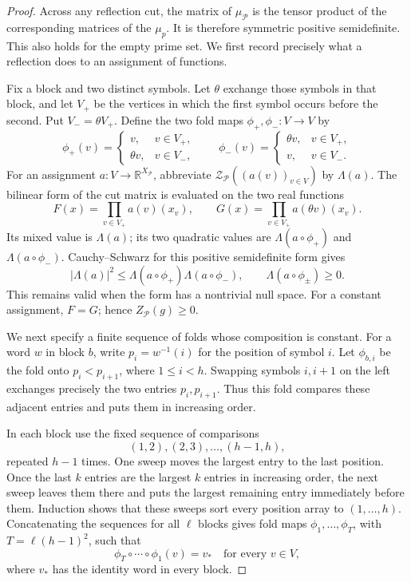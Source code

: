 \begin{proof}
Across any reflection cut, the matrix of \(\mu_{\mathcal P}\) is
the tensor product of the corresponding matrices of the \(\mu_p\).
It is therefore symmetric positive semidefinite.  This also holds for
the empty prime set.  We first record precisely what a reflection does
to an assignment of functions.

Fix a block and two distinct symbols.  Let \(\theta\) exchange those
symbols in that block, and let \(V_+\) be the vertices in which the
first symbol occurs before the second.  Put \(V_-=\theta V_+\).
Define the two fold maps \(\phi_+,\phi_-:V\to V\) by
\[
 \phi_+(v)=
 \begin{cases}v,&v\in V_+,\\\theta v,&v\in V_-,\end{cases}
 \qquad
 \phi_-(v)=
 \begin{cases}\theta v,&v\in V_+,\\v,&v\in V_-.\end{cases}
\]
For an assignment \(a:V\to\mathbb R^{X_{\mathcal P}}\), abbreviate
\(\mathcal Z_{\mathcal P}((a(v))_{v\in V})\) by \(\Lambda(a)\).
The bilinear form of the cut matrix is evaluated on the two real
functions
\[
 F(x)=\prod_{v\in V_+}a(v)(x_v),
 \qquad
 G(x)=\prod_{v\in V_+}a(\theta v)(x_v).
\]
Its mixed value is \(\Lambda(a)\); its two quadratic values are
\(\Lambda(a\circ\phi_+)\) and \(\Lambda(a\circ\phi_-)\).
Cauchy--Schwarz for this positive semidefinite form gives
\begin{equation}
 |\Lambda(a)|^2
 \le\Lambda(a\circ\phi_+)\Lambda(a\circ\phi_-),
 \qquad
 \Lambda(a\circ\phi_\pm)\ge0.
 \label{eq:folding-cauchy-schwarz}
\end{equation}
This remains valid when the form has a nontrivial null space.
For a constant assignment, \(F=G\); hence \(Z_{\mathcal P}(g)\ge0\).

We next specify a finite sequence of folds whose composition is constant.
For a word \(w\) in block \(b\), write \(p_i=w^{-1}(i)\) for the
position of symbol \(i\).  Let \(\phi_{b,i}\) be the fold onto
\(p_i<p_{i+1}\), where \(1\le i<h\).  Swapping symbols \(i,i+1\)
on the left exchanges precisely the two entries \(p_i,p_{i+1}\).
Thus this fold compares these adjacent entries and puts them in
increasing order.

In each block use the fixed sequence of comparisons
\[
 (1,2),(2,3),\ldots,(h-1,h),
\]
repeated \(h-1\) times.  One sweep moves the largest entry to the
last position.  Once the last \(k\) entries are the largest \(k\)
entries in increasing order, the next sweep leaves them there and puts
the largest remaining entry immediately before them.  Induction shows
that these sweeps sort every position array to \((1,\ldots,h)\).
Concatenating the sequences for all \(\ell\) blocks gives fold maps
\(\phi_1,\ldots,\phi_T\), with \(T=\ell(h-1)^2\), such that
\begin{equation}
 \phi_T\circ\cdots\circ\phi_1(v)=v_*
 \quad\text{for every }v\in V,
 \label{eq:constant-fold-composition}
\end{equation}
where \(v_*\) has the identity word in every block.


\end{proof}
